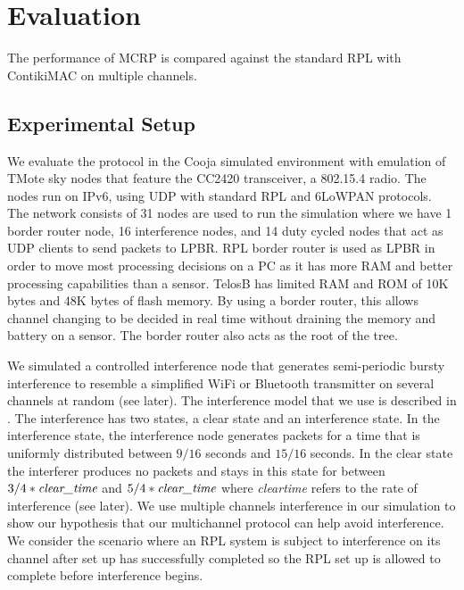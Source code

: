 \section{Evaluation}
\label{sec:evaluation}
The performance of MCRP is compared against the standard RPL with ContikiMAC on multiple channels.

\subsection{Experimental Setup}
We evaluate the protocol in the  Cooja simulated environment with emulation of TMote sky nodes that feature the CC2420 transceiver, a 802.15.4 radio. The nodes run on IPv6, using UDP with standard RPL and 6LoWPAN protocols. The network consists of 31 nodes are used to run the simulation where we have 1 border router node, 16 interference nodes, and 14 duty cycled nodes that act as UDP clients to send packets to LPBR. RPL border router is used as LPBR in order to move most processing decisions on a PC as it has more RAM and better processing capabilities than a sensor. TelosB has limited RAM and ROM of 10K bytes and 48K bytes of flash memory. By using a border router, this allows channel changing to be decided in real time without draining the memory and battery on a sensor. The border router also acts as the root of the tree.

We simulated a controlled interference node that generates semi-periodic bursty interference to resemble a simplified WiFi or Bluetooth transmitter on several channels at random (see later). The interference model that we use is described in \cite{Boano:2010:MSM:2127940.2127963}. The interference has two states, a clear state and an interference state. 
In the interference state, the interference node generates packets for a time that is uniformly distributed between $9/16$ seconds and $15/16$ seconds. In the clear state the interferer produces no packets and stays in this state for between $3/4 * \emph{clear\textunderscore time}$ and $5/4 * \emph{clear\textunderscore time}$ where \emph{clear\textunderscore time} refers to the rate of interference (see later).
We use multiple channels interference in our simulation to show our hypothesis that our multichannel protocol can help avoid interference. We consider the scenario where an RPL system is subject to interference on its channel after set up has successfully completed so the RPL set up is allowed to complete before interference begins.

